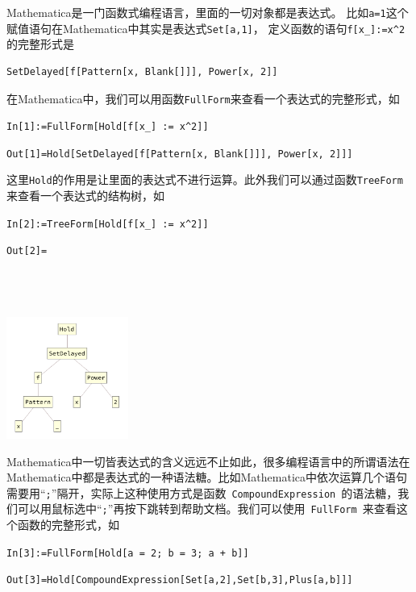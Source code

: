 \documentclass[UTF8,a4paper,10pt]{ctexart}
\newcommand{\mma}{Mathematica}
\begin{document}
\mma 是一门函数式编程语言，里面的一切对象都是表达式。
比如\verb|a=1|这个赋值语句在Mathematica中其实是表达式\verb|Set[a,1]|，
定义函数的语句\verb|f[x_]:=x^2|的完整形式是

\begin{lstlisting}
SetDelayed[f[Pattern[x, Blank[]]], Power[x, 2]]
\end{lstlisting}

\noindent
在\mma 中，我们可以用函数\verb|FullForm|来查看一个表达式的完整形式，如

\verb|In[1]:=FullForm[Hold[f[x_] := x^2]]|

\verb|Out[1]=Hold[SetDelayed[f[Pattern[x, Blank[]]], Power[x, 2]]]|

\noindent
这里\verb|Hold|的作用是让里面的表达式不进行运算。此外我们可以通过函数\verb|TreeForm|来查看一个表达式的结构树，如

\verb|In[2]:=TreeForm[Hold[f[x_] := x^2]]|

\begin{minipage}[b]{0.0cm}
\verb|Out[2]=|
\\\\\\\\%
\end{minipage}
\hfill
\begin{minipage}[b]{14.3cm}\ccwd
\includegraphics[height=4cm]{img/TreeForm.pdf}
\end{minipage}

\noindent
\mma 中一切皆表达式的含义远远不止如此，很多编程语言中的所谓语法在\mma 中都是表达式的一种语法糖。比如\mma 中依次运算几个语句需要用“\verb|;|”隔开，实际上这种使用方式是函数~\verb|CompoundExpression|~的语法糖，我们可以用鼠标选中“\verb|;|”再按下跳转到帮助文档。我们可以使用~\verb|FullForm|~来查看这个函数的完整形式，如

\verb|In[3]:=FullForm[Hold[a = 2; b = 3; a + b]]|

\verb|Out[3]=Hold[CompoundExpression[Set[a,2],Set[b,3],Plus[a,b]]]|
\end{document}
